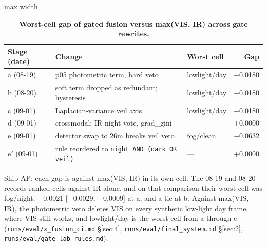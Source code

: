 \documentclass[10pt]{article}
\begin{document}
\begin{table}[htbp]
\centering
\small
\caption{\textbf{Worst-cell gap of gated fusion versus max(VIS, IR) across gate rewrites.}}
\label{tab:6}
\begin{adjustbox}{max width=\linewidth}
\begin{tabular}{lllr}
\toprule
Stage (date) & Change & Worst cell & Gap \\
\midrule
a (08-19) & p05 photometric term, hard veto & lowlight/day & $-$0.0180 \\
b (08-20) & soft term dropped as redundant; hysteresis & lowlight/day & $-$0.0180 \\
c (09-01) & Laplacian-variance veil axis & lowlight/day & $-$0.0180 \\
d (09-01) & crossmodal: IR night vote, grad\_gini & --- & +0.0000 \\
e (09-01) & detector swap to 26m breaks veil veto & fog/clean & $-$0.0632 \\
e$'$ (09-01) & rule reordered to \texttt{night AND (dark OR veil)} & --- & +0.0000 \\
\bottomrule
\end{tabular}
\end{adjustbox}
\par\smallskip\raggedright\footnotesize Ship AP; each gap is against max(VIS, IR) in its own cell. The 08-19 and 08-20 records ranked cells against IR alone, and on that comparison their worst cell was fog/night: $-$0.0021 [$-$0.0029, $-$0.0009] at a, and a tie at b. Against max(VIS, IR), the photometric veto deletes VIS on every synthetic low-light day frame, where VIS still works, and lowlight/day is the worst cell from a through c (\texttt{runs/\allowbreak{}eval/\allowbreak{}x\_\allowbreak{}fusion\_\allowbreak{}ci.md} \S\ref{sec:4}, \texttt{runs/\allowbreak{}eval/\allowbreak{}final\_\allowbreak{}system.md} \S\ref{sec:2}, \texttt{runs/\allowbreak{}eval/\allowbreak{}gate\_\allowbreak{}lab\_\allowbreak{}rules.md}).
\end{table}
\end{document}
